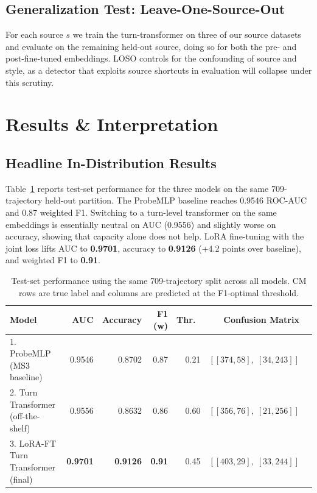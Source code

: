 \documentclass{article}
\begin{document}
\subsection{Generalization Test: Leave-One-Source-Out}

For each source $s$ we train the turn-transformer on three of our source datasets and evaluate on the remaining held-out source, doing so for both the pre- and post-fine-tuned embeddings. LOSO controls for the confounding of source and style, as a detector that exploits source shortcuts in evaluation will collapse under this scrutiny.


\section{Results \& Interpretation}

\subsection{Headline In-Distribution Results}

Table~\ref{tab:headline} reports test-set performance for the three models on the same 709-trajectory held-out partition. The ProbeMLP baseline reaches 0.9546 ROC-AUC and 0.87 weighted F1. Switching to a turn-level transformer on the same embeddings is essentially neutral on AUC (0.9556) and slightly worse on accuracy, showing that capacity alone does not help. LoRA fine-tuning with the joint loss lifts AUC to \textbf{0.9701}, accuracy to \textbf{0.9126} (+4.2 points over baseline), and weighted F1 to \textbf{0.91}.

\begin{table}[h]
  \caption{Test-set performance using the same 709-trajectory split across all models. CM rows are true label and columns are predicted at the F1-optimal threshold.}
  \label{tab:headline}
  \centering
  \begin{tabular}{lrrrrrl}
    \toprule
    Model & AUC & Accuracy & F1 (w) & Thr.\ & Confusion Matrix \\
    \midrule
    1. ProbeMLP (MS3 baseline)              & 0.9546 & 0.8702 & 0.87 & 0.21 & $[[374, 58],\;[34, 243]]$ \\
    2. Turn Transformer (off-the-shelf)     & 0.9556 & 0.8632 & 0.86 & 0.60 & $[[356, 76],\;[21, 256]]$ \\
    3. LoRA-FT Turn Transformer (final)     & \textbf{0.9701} & \textbf{0.9126} & \textbf{0.91} & 0.45 & $[[403, 29],\;[33, 244]]$ \\
    \bottomrule
  \end{tabular}
\end{table}
\end{document}
